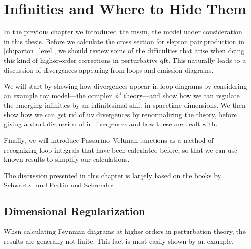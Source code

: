 \chapter{Infinities and Where to Hide Them}\label{ch:divergences}

In the previous chapter we introduced the \gls{mssm}, the model under consideration in this thesis.
Before we calculate the cross section for slepton pair production in \cref{ch:parton_level}, we should review some of the difficulties that arise when doing this kind of higher-order corrections in perturbative \gls{qft}.
This naturally leads to a discussion of divergences appearing from loops and emission diagrams.

We will start by showing how divergences appear in loop diagrams by considering an example toy model---the complex $\phi^4$ theory---and show how we can regulate the emerging infinities by an infinitesimal shift in spacetime dimensions. We then show how we can get rid of \gls{uv} divergences by renormalizing the theory, before giving a short discussion of \gls{ir} divergences and how these are dealt with.

Finally, we will introduce Passarino--Veltman functions as a method of recognizing loop integrals that have been calculated before, so that we can use known results to simplify our calculations.

The discussion presented in this chapter is largely based on the books by Schwartz~\cite{Schwartz:2014sze} and Peskin and Schroeder~\cite{Peskin:1995ev}.


\section{Dimensional Regularization}\label{sec:dimreg}

When calculating Feynman diagrams at higher orders in perturbation theory, the results are generally not finite. This fact is most easily shown by an example.

